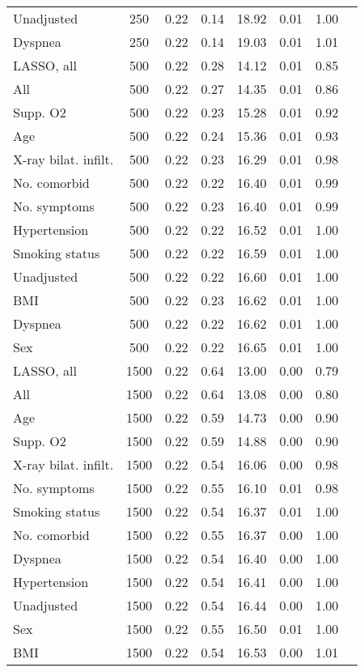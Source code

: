 \documentclass{article}
\begin{document}
{\begin{longtable}{lccccccc}
Unadjusted & 250 & 0.22 & 0.14 &  18.92 & 0.01 & 1.00 \\ 
Dyspnea & 250 & 0.22 & 0.14 &  19.03 & 0.01 & 1.01 \\ \midrule 
LASSO, all & 500 & 0.22 & 0.28 &  14.12 & 0.01 & 0.85 \\ 
All & 500 & 0.22 & 0.27 &  14.35 & 0.01 & 0.86 \\ 
Supp. O2 & 500 & 0.22 & 0.23 &  15.28 & 0.01 & 0.92 \\ 
Age & 500 & 0.22 & 0.24 &  15.36 & 0.01 & 0.93 \\ 
X-ray bilat. infilt. & 500 & 0.22 & 0.23 &  16.29 & 0.01 & 0.98 \\ 
No. comorbid & 500 & 0.22 & 0.22 &  16.40 & 0.01 & 0.99 \\ 
No. symptoms & 500 & 0.22 & 0.23 &  16.40 & 0.01 & 0.99 \\ 
Hypertension & 500 & 0.22 & 0.22 &  16.52 & 0.01 & 1.00 \\ 
Smoking status & 500 & 0.22 & 0.22 &  16.59 & 0.01 & 1.00 \\ 
Unadjusted & 500 & 0.22 & 0.22 &  16.60 & 0.01 & 1.00 \\ 
BMI & 500 & 0.22 & 0.23 &  16.62 & 0.01 & 1.00 \\ 
Dyspnea & 500 & 0.22 & 0.22 &  16.62 & 0.01 & 1.00 \\ 
Sex & 500 & 0.22 & 0.22 &  16.65 & 0.01 & 1.00 \\ \midrule 
LASSO, all & 1500 & 0.22 & 0.64 &  13.00 & 0.00 & 0.79 \\ 
All & 1500 & 0.22 & 0.64 &  13.08 & 0.00 & 0.80 \\ 
Age & 1500 & 0.22 & 0.59 &  14.73 & 0.00 & 0.90 \\ 
Supp. O2 & 1500 & 0.22 & 0.59 &  14.88 & 0.00 & 0.90 \\ 
X-ray bilat. infilt. & 1500 & 0.22 & 0.54 &  16.06 & 0.00 & 0.98 \\ 
No. symptoms & 1500 & 0.22 & 0.55 &  16.10 & 0.01 & 0.98 \\ 
Smoking status & 1500 & 0.22 & 0.54 &  16.37 & 0.01 & 1.00 \\ 
No. comorbid & 1500 & 0.22 & 0.55 &  16.37 & 0.00 & 1.00 \\ 
Dyspnea & 1500 & 0.22 & 0.54 &  16.40 & 0.00 & 1.00 \\ 
Hypertension & 1500 & 0.22 & 0.54 &  16.41 & 0.00 & 1.00 \\ 
Unadjusted & 1500 & 0.22 & 0.54 &  16.44 & 0.00 & 1.00 \\ 
Sex & 1500 & 0.22 & 0.55 &  16.50 & 0.01 & 1.00 \\ 
BMI & 1500 & 0.22 & 0.54 &  16.53 & 0.00 & 1.01 \\
\bottomrule
\hline
\end{longtable}
}
\end{document}
